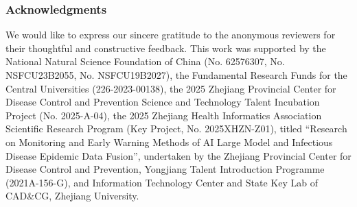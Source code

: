 \documentclass{article} %
\begin{document}
\subsubsection*{Acknowledgments}
We would like to express our sincere gratitude to the anonymous reviewers for their thoughtful and constructive feedback. This work was supported by the National Natural Science Foundation of China (No. 62576307, No. NSFCU23B2055, No. NSFCU19B2027), the Fundamental Research Funds for the Central Universities (226-2023-00138), the 2025 Zhejiang Provincial Center for Disease Control and Prevention Science and Technology Talent Incubation Project (No. 2025-A-04), the 2025 Zhejiang Health Informatics Association Scientific Research Program (Key Project, No. 2025XHZN-Z01), titled ``Research on Monitoring and Early Warning Methods of AI Large Model and Infectious Disease Epidemic Data Fusion'', undertaken by the Zhejiang Provincial Center for Disease Control and Prevention, Yongjiang Talent Introduction Programme (2021A-156-G),  and Information Technology Center and State Key Lab of CAD\&CG, Zhejiang University.  




\clearpage

\appendix



% 

\end{document}
